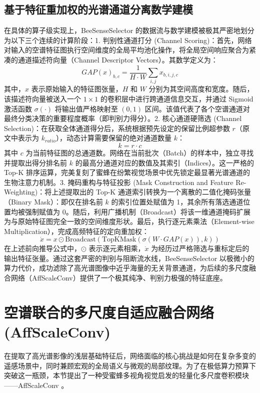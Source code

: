 \subsection{基于特征重加权的光谱通道分离数学建模}
在具体的算子级实现上，BeeSenseSelector 的数据流与数学建模被极其严密地划分为以下三个连续的计算阶段：1. 判别性通道打分 (Channel Scoring)：首先，网络对输入的空谱特征图执行空间维度的全局平均池化操作，将全局空间响应聚合为紧凑的通道描述符向量（Channel Descriptor Vectors）。其数学定义为：$$GAP(x)_{b,c} = \frac{1}{H \cdot W} \sum_{i,j} x_{b,i,j,c}$$其中，$x$ 表示原始输入的特征图张量，$H$ 和 $W$ 分别为其空间高度和宽度。随后，该描述符向量被送入一个 $1 \times 1$ 的卷积层中进行跨通道信息交互，并通过 Sigmoid 激活函数 $\sigma(\cdot)$ 将输出值严格映射至 $(0, 1)$ 区间。该值代表了各个空谱通道对最终分类决策的重要程度概率（即判别力得分）。2. 核心通道硬筛选 (Channel Selection)：在获取全体通道得分后，系统根据预先设定的保留比例超参数 $r$（原文中表示为 $k_{ratio}$），动态计算需要保留的绝对通道数量 $k$：$$k = r \cdot c$$其中 $c$ 为当前特征图的总通道数。网络在当前批次（Batch）的样本中，独立寻找并提取出得分排名前 $k$ 的最高分通道对应的数值及其索引（Indices）。这一严格的 Top-K 排序运算，完美复刻了蜜蜂在纷繁视觉场景中优先锁定最显著光谱通道的生物注意力机制。3. 掩码重构与特征投影 (Mask Construction and Feature Re-Weighting)：将上述提取出的 Top-K 通道索引转换为一个离散的二值化掩码张量（Binary Mask）：即仅在排名前 $k$ 的索引位置处赋值为 1，其余所有落选通道位置均被强制赋值为 0。随后，利用广播机制（Broadcast）将该一维通道掩码扩展为与原始特征图完全一致的空间维度形状。最后，执行逐元素乘法（Element-wise Multiplication），完成高频特征的定向重加权：$$\dot{x} = x \odot \text{Broadcast}(\text{TopKMask}(\sigma(W \cdot GAP(x)), k))$$在上述前向推导公式中，$\odot$ 表示逐元素相乘，$\dot{x}$ 为经历过严格筛选与重标定后的输出特征张量。通过这套严密的判别与阻断流水线，BeeSenseSelector 以极微小的算力代价，成功滤除了高光谱图像中近乎海量的无关背景通道，为后续的多尺度融合网络（AffScaleConv）提供了一个极其纯净、判别力极强的特征底座。

\section{空谱联合的多尺度自适应融合网络 (AffScaleConv)}
在提取了高光谱影像的浅层基础特征后，网络面临的核心挑战是如何在复杂多变的遥感场景中，同时兼顾宏观的全局语义与微观的局部纹理。为了在极低算力预算下突破这一瓶颈，本节提出了一种受蜜蜂多视角视觉启发的轻量化多尺度卷积模块——AffScaleConv 。

